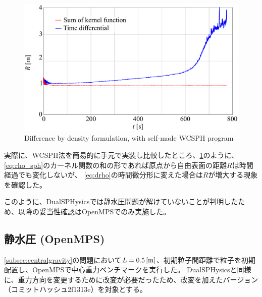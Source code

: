 		\begin{figure} \centering
			\includegraphics[clip, width=\linewidth]{img/time-radius.pdf}
			\caption{Difference by density formulation, with self-made WCSPH program \label{fig:rho_sum}}
		\end{figure}
		実際に、WCSPH法を簡易的に手元で実装し比較したところ、\cref{fig:rho_sum}のように、\cref{eq:rho_sph}のカーネル関数の和の形であれば原点から自由表面の距離$R$は時間経過でも変化しないが、
		\cref{eq:drho}の時間微分形に変えた場合は$R$が増大する現象を確認した。

		このように、DualSPHysicsでは静水圧問題が解けていないことが判明したため、以降の妥当性確認はOpenMPSでのみ実施した。

	\subsection{静水圧 (OpenMPS) \label{subsec:gc}}
		\cref{subsec:centralgravity}の問題において$L=\SI{0.5}{[m]}$、初期粒子間距離で粒子を初期配置し、OpenMPSで中心重力ベンチマークを実行した。
		DualSPHysicsと同様に、重力方向を変更するために改変が必要だったため、改変を加えたバージョン（コミットハッシュ2f1313e）を対象とする。

